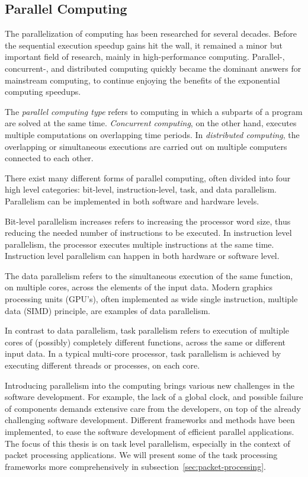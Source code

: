 \subsection{Parallel Computing}
\label{subsection:parallel-computing}

The parallelization of computing has been researched for several decades. Before the sequential execution speedup gains hit the wall, it remained a minor but important field of research, mainly in high-performance computing. Parallel-, concurrent-, and distributed computing quickly became the dominant answers for mainstream computing, to continue enjoying the benefits of the exponential computing speedups.

The \emph{parallel computing type} refers to computing in which a subparts of a program are solved at the same time. \emph{Concurrent computing}, on the other hand, executes multiple computations on overlapping time periods. In \emph{distributed computing}, the overlapping or simultaneous executions are carried out on multiple computers connected to each other.

There exist many different forms of parallel computing, often divided into four high level categories: bit-level, instruction-level, task, and data parallelism. Parallelism can be implemented in both software and hardware levels.~\cite{Culler:1997:PCA}

Bit-level parallelism increases refers to increasing the processor word size, thus reducing the needed number of instructions to be executed. In instruction level parallelism, the processor executes multiple instructions at the same time. Instruction level parallelism can happen in both hardware or software level.~\cite{Culler:1997:PCA}

The data parallelism refers to the simultaneous execution of the same function, on multiple cores, across the elements of the input data. Modern graphics processing units (GPU's), often implemented as wide single instruction, multiple data (SIMD) principle, are examples of data parallelism.~\cite{Culler:1997:PCA}

In contrast to data parallelism, task parallelism refers to execution of multiple cores of (possibly) completely different functions, across the same or different input data. In a typical multi-core processor, task parallelism is achieved by executing different threads or processes, on each core.~\cite{Culler:1997:PCA}

Introducing parallelism into the computing brings various new challenges in the software development. For example, the lack of a global clock, and possible failure of components demands extensive care from the developers, on top of the already challenging software development. Different frameworks and methods have been implemented, to ease the software development of efficient parallel applications. The focus of this thesis is on task level parallelism, especially in the context of packet processing applications. We will present some of the task processing frameworks more comprehensively in subsection~\ref{sec:packet-processing}.~\cite{Asanovic:2006:Landscape}

